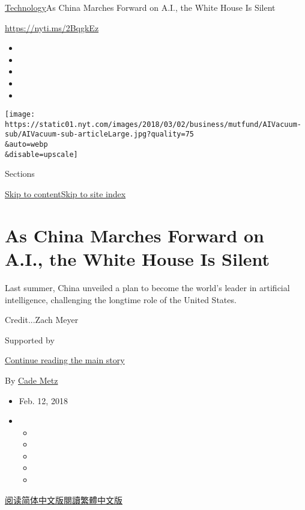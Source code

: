\href{/section/technology}{Technology}\textbar{}As China Marches Forward
on A.I., the White House Is Silent

\url{https://nyti.ms/2BqgkEz}

\begin{itemize}
\item
\item
\item
\item
\item
\end{itemize}

\texttt{[image: https://static01.nyt.com/images/2018/03/02/business/mutfund/AIVacuum-sub/AIVacuum-sub-articleLarge.jpg?quality=75\\\&auto=webp\\\&disable=upscale]}

Sections

\protect\hyperlink{site-content}{Skip to
content}\protect\hyperlink{site-index}{Skip to site index}

\hypertarget{as-china-marches-forward-on-ai-the-white-house-is-silent}{%
\section{As China Marches Forward on A.I., the White House Is
Silent}\label{as-china-marches-forward-on-ai-the-white-house-is-silent}}

Last summer, China unveiled a plan to become the world's leader in
artificial intelligence, challenging the longtime role of the United
States.

Credit...Zach Meyer

Supported by

\protect\hyperlink{after-sponsor}{Continue reading the main story}

By \href{https://www.nytimes.com/by/cade-metz}{Cade Metz}

\begin{itemize}
\item
  Feb. 12, 2018
\item
  \begin{itemize}
  \item
  \item
  \item
  \item
  \item
  \end{itemize}
\end{itemize}

\href{https://cn.nytimes.com/china/20180213/china-trump-artificial-intelligence/}{阅读简体中文版}\href{https://cn.nytimes.com/china/20180213/china-trump-artificial-intelligence/zh-hant/}{閱讀繁體中文版}

